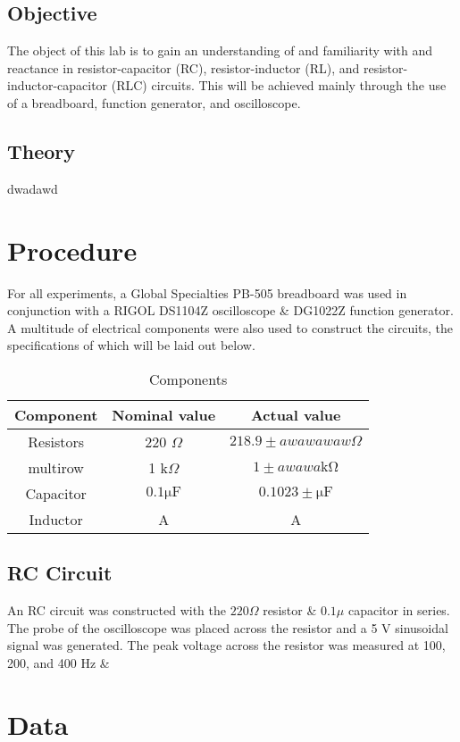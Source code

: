 \documentclass{article}
\begin{document}
		\subsection{Objective}
			The object of this lab is to gain an understanding of and familiarity with and reactance in resistor-capacitor (RC), resistor-inductor (RL), and resistor-inductor-capacitor (RLC) circuits. This will be achieved mainly through the use of a breadboard, function generator, and oscilloscope.

		\subsection{Theory}
			dwadawd

	\section{Procedure}
		For all experiments, a Global Specialties PB-505 breadboard was used in conjunction with a RIGOL DS1104Z oscilloscope \& DG1022Z function generator. A multitude of electrical components were also used to construct the circuits, the specifications of which will be laid out below.
		\begin{table}[htbp]
	\centering
	\caption{Components}
	\begin{tabular}{ccc}
		\hline
		Component & Nominal value & Actual value \\ \hline
		Resistors & 220 $\Omega$ & $218.9  \pm awawawaw\Omega$ \\
		multirow & 1 k$\Omega$ & $1 \pm awawa\mathrm{k\Omega}$ \\
		Capacitor & $0.1 \mathrm{\mu F}$ & $0.1023 \pm \mathrm{\mu F}$ \\
		Inductor & A & A \\ \hline
	\end{tabular}
\end{table}

		\subsection{RC Circuit}
			An RC circuit was constructed with the $220 \Omega$ resistor \& $0.1 \mu$ capacitor in series. The probe of the oscilloscope was placed across the resistor and a 5 V sinusoidal signal was generated. The peak voltage across the resistor was measured at 100, 200, and 400 Hz \&


	\section{Data}
\end{document}
